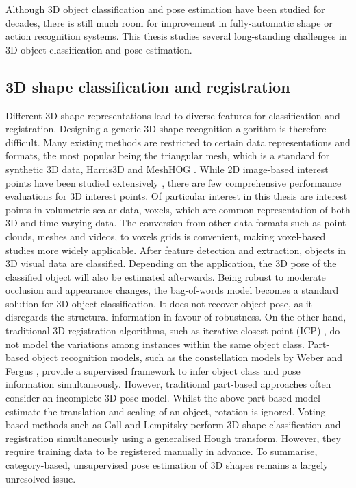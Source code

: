 Although 3D object classification and pose estimation have been studied for decades, there is still much room for improvement in fully-automatic shape or action recognition systems. 
This thesis studies several long-standing challenges in 3D object classification and pose estimation.  

\subsection{3D shape classification and registration} 

Different 3D shape representations lead to diverse features for classification and registration. Designing a generic 3D shape recognition algorithm is therefore difficult. Many existing methods are restricted to certain data representations and formats, the most popular being the triangular mesh, which is a standard for synthetic 3D data, \eg Harris3D \cite{Sipiran2011} and MeshHOG \cite{Zaharescu2009}.     
While 2D image-based interest points have been studied extensively \cite{Mikolajczyk2005}, there are few comprehensive performance evaluations for 3D interest points. 
Of particular interest in this thesis are interest points in volumetric scalar data, \ie voxels, which are common representation of both 3D and time-varying data. 
The conversion from other data formats such as point clouds, meshes and videos, to voxels grids is convenient, making voxel-based studies more widely applicable. 
After feature detection and extraction, objects in 3D visual data are classified.  
Depending on the application, the 3D pose of the classified object will also be estimated afterwards. 
Being robust to moderate occlusion and appearance changes, the bag-of-words model becomes a standard solution for 3D object classification. It does not recover object pose, as it disregards the structural information in favour of robustness. 
On the other hand, traditional 3D registration algorithms, such as iterative closest point (ICP) \cite{Besl1992}, do not model the variations among instances within the same object class.
Part-based object recognition models, such as the constellation models by Weber \etal \cite{Weber2000} and Fergus \etal \cite{Fergus2007}, provide a supervised framework to infer object class and pose information simultaneously. However, traditional part-based approaches often consider an incomplete 3D pose model. Whilst the above part-based model estimate the translation and scaling of an object, rotation is ignored.      
Voting-based methods such as Gall and Lempitsky \cite{Gall2009a} perform 3D shape classification and registration simultaneously using a generalised Hough transform. However, they require training data to be registered manually in advance.  
To summarise, category-based, unsupervised pose estimation of 3D shapes remains a largely unresolved issue. 

